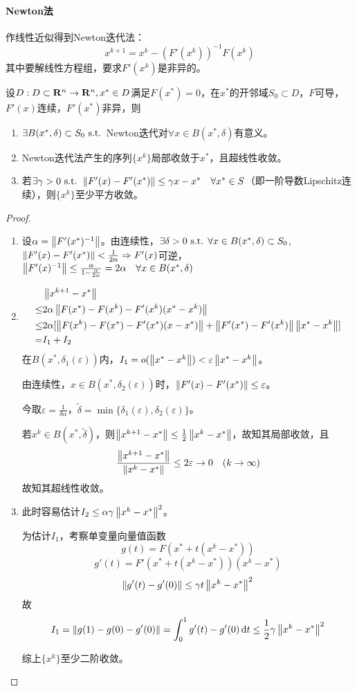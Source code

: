 \documentclass{ctexart}
\begin{document}
\paragraph{Newton法}作线性近似得到Newton迭代法：
\[x^{k+1}=x^k-(F'(x^k))^{-1}F(x^k)\]
其中要解线性方程组，要求$F'(x^k)$是非异的。

\begin{Thm}
设$D:D\subset \mathbf{R}^n\to\mathbf{R}^n,x^*\in D$满足$F(x^*)=0$，在$x^*$的开邻域$S_0\subset D$，$F$可导，$F'(x)$连续，$F'(x^*)$非异，则
\begin{enumerate}
\item $\exists B(x^*,\delta)\subset S_0\text{ s.t. }$Newton迭代对$\forall x\in B(x^*,\delta)$有意义。
\item Newton迭代法产生的序列$\{x^k\}$局部收敛于$x^*$，且超线性收敛。
\item 若$\exists \gamma>0\text{ s.t. } \left\|F'(x)-F'(x^*) \right\|\leq \gamma{x-x^*}\quad \forall x^*\in S$（即一阶导数Lipschitz连续），则$\{x^k\}$至少平方收敛。
\end{enumerate}
\end{Thm}

\begin{proof}
\begin{enumerate}
\item 设$\alpha=\left\|F'(x^*)^{-1} \right\|$。由连续性，$\exists \delta>0\text{ s.t. }\forall x\in B(x^*,\delta)\subset S_0$,$\left\|F'(x)-F'(x^*) \right\|<\frac{1}{2\alpha}\Rightarrow F'(x)$可逆，$\left\|F'(x)^{-1} \right\|\leq\frac{\alpha}{1-\frac{\alpha}{2\alpha}}=2\alpha\quad\forall x\in B(x^*,\delta)$
\item 
\begin{align*}
&\left\|x^{k+1}-x^* \right\|\\
\leq &2\alpha\left\|F(x^*)-F(x^k)-F'(x^k)(x^*-x^k) \right\|\\
\leq &2\alpha[\left\|F(x^k)-F(x^*)-F'(x^*)(x-x^*) \right\|+\left\|F'(x^*)-F'(x^k) \right\|\left\|x^*-x^k \right\|]\\
=&I_1+I_2
\end{align*}
在$B(x^*,\delta_1(\varepsilon))$内，$I_1=o(\left\|x^*-x^k \right\|)<\varepsilon\left\|x^*-x^k \right\|$。

由连续性，$x\in B(x^*,\delta_2(\varepsilon))$时，$\left\|F'(x)-F'(x^*) \right\|\leq\varepsilon$。

今取$\varepsilon=\frac{1}{\delta\alpha}$，$\tilde{\delta}=\min\{\delta_1(\varepsilon),\delta_2(\varepsilon)\}$。

若$x^k\in B(x^*,\tilde{\delta})$，则$\left\|x^{k+1}-x^* \right\|\leq\frac{1}{2}\left\|x^k-x^* \right\|$，故知其局部收敛，且\[\frac{\left\|x^{k+1}-x^* \right\|}{\left\|x^k-x^* \right\|}\leq 2\varepsilon\to 0\quad(k\to\infty)\]
故知其超线性收敛。
\item 

此时容易估计$I_2\leq\alpha\gamma\left\|x^k-x^* \right\|^2$。

为估计$I_1$，考察单变量向量值函数\[g(t)=F(x^*+t(x^k-x^*))\]\[g'(t)=F'(x^*+t(x^k-x^*))(x^k-x^*)\]\[\left\|g'(t)-g'(0) \right\|\leq \gamma t\left\|x^k-x^* \right\|^2\] 故
\[I_1=\left\|g(1)-g(0)-g'(0) \right\|
=\int_0^1 g'(t)-g'(0)\,\mathrm{d} t
\leq \frac{1}{2}\gamma\left\|x^k-x^* \right\|^2\]

综上$\{x^k\}$至少二阶收敛。
\end{enumerate}
\end{proof}
\end{document}
